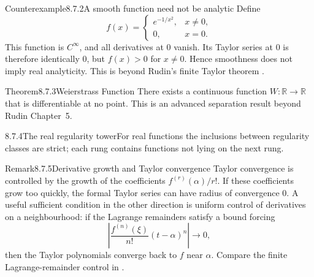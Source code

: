 \documentclass[main.tex]{subfiles}
\begin{document}
\begin{Obj}{Counterexample}{8.7.2}{A smooth function need not be analytic}
Define
\[
  f(x)=
  \begin{cases}
    e^{-1/x^2}, & x\ne0,\\
    0, & x=0.
  \end{cases}
\]
This function is $C^\infty$, and all derivatives at $0$ vanish. Its Taylor series at $0$ is
therefore identically $0$, but $f(x)>0$ for $x\ne0$. Hence smoothness does not imply real
analyticity. This is beyond Rudin's finite Taylor theorem .
\end{Obj}

\begin{Obj}{Theorem}{8.7.3}{Weierstrass Function}
There exists a continuous function $W:\mathbb R\to\mathbb R$ that is differentiable at no
point. This is an advanced separation result beyond Rudin Chapter~5.
\end{Obj}


\begin{Fig}{8.7.4}{The real regularity tower}{For real functions the inclusions between
regularity classes are strict; each rung contains functions not lying on the next rung.}
\end{Fig}

\begin{ObjL}{Remark}{8.7.5}{Derivative growth and Taylor convergence}
Taylor convergence is controlled by the growth of the coefficients
$f^{(r)}(\alpha)/r!$. If these coefficients grow too quickly, the formal Taylor series can
have radius of convergence $0$. A useful sufficient condition in the other direction is
uniform control of derivatives on a neighbourhood: if the Lagrange remainders satisfy a bound
forcing
\[
  \left|\frac{f^{(n)}(\xi)}{n!}(t-\alpha)^n\right|\longrightarrow0,
\]
then the Taylor polynomials converge back to $f$ near $\alpha$. Compare the finite
Lagrange-remainder control in .
\end{ObjL}
\end{document}
